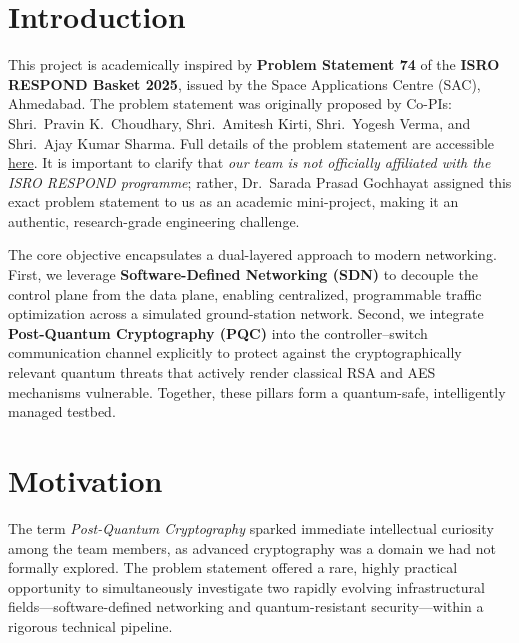 \documentclass[12pt]{article}
\begin{document}
\newpage

\section{Introduction}

This project is academically inspired by \textbf{Problem Statement 74} of the \textbf{ISRO RESPOND Basket 2025}, issued by the Space Applications Centre (SAC), Ahmedabad. The problem statement was originally proposed by Co-PIs: Shri.\ Pravin K.\ Choudhary, Shri.\ Amitesh Kirti, Shri.\ Yogesh Verma, and Shri.\ Ajay Kumar Sharma. Full details of the problem statement are accessible \href{https://drive.google.com/drive/folders/1wXDHR90B_jLwRPzc9-hzkW6grw2Gb_RV?usp=sharing}{here}. It is important to clarify that \textit{our team is not officially affiliated with the ISRO RESPOND programme}; rather, Dr.\ Sarada Prasad Gochhayat assigned this exact problem statement to us as an academic mini-project, making it an authentic, research-grade engineering challenge.

The core objective encapsulates a dual-layered approach to modern networking. First, we leverage \textbf{Software-Defined Networking (SDN)} to decouple the control plane from the data plane, enabling centralized, programmable traffic optimization across a simulated ground-station network. Second, we integrate \textbf{Post-Quantum Cryptography (PQC)} into the controller--switch communication channel explicitly to protect against the cryptographically relevant quantum threats that actively render classical RSA and AES mechanisms vulnerable. Together, these pillars form a quantum-safe, intelligently managed testbed.

\section{Motivation}

The term \textit{Post-Quantum Cryptography} sparked immediate intellectual curiosity among the team members, as advanced cryptography was a domain we had not formally explored. The problem statement offered a rare, highly practical opportunity to simultaneously investigate two rapidly evolving infrastructural fields—software-defined networking and quantum-resistant security—within a rigorous technical pipeline.
\end{document}

